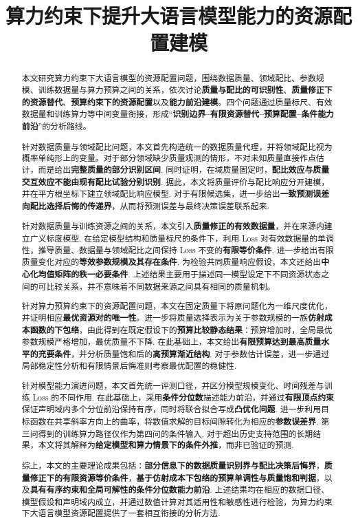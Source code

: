 \documentclass[bwprint]{gmcmthesis}
\title{算力约束下提升大语言模型能力的资源配置建模}
\theoremstyle{definition}
\theoremstyle{plain}
\theoremstyle{remark}
\begin{document}
\maketitle

\begin{abstract}
本文研究算力约束下大语言模型的资源配置问题，围绕数据质量、领域配比、参数规模、训练数据量与算力预算之间的关系，依次讨论\textbf{质量与配比的可识别性}、\textbf{质量修正下的资源替代}、\textbf{预算约束下的资源配置}以及\textbf{能力前沿建模}。四个问题通过质量标尺、有效数据量和训练算力等中间变量衔接，形成“\textbf{识别边界--有限资源替代--预算配置--条件能力前沿}”的分析路线。

针对数据质量与领域配比问题，本文首先构造统一的数据质量代理，并将领域配比视为概率单纯形上的变量。对于部分领域缺少质量观测的情形，不对未知质量直接作点估计，而是给出\textbf{完整质量的部分识别区间}. 同时证明，在域质量固定时，\textbf{配比效应与质量交互效应不能由现有配比试验分别识别}. 据此，本文将质量评价与配比响应分开建模，并在平方根坐标下建立领域配比响应模型. 对于有限候选集，进一步给出\textbf{一致预测误差向配比选择后悔的传递界}，从而将预测误差与最终决策误差联系起来.

针对数据质量与训练资源之间的关系，本文引入\textbf{质量修正的有效数据量}，并在来源内建立广义标度模型. 在给定模型结构和质量标尺的条件下，利用 Loss 对有效数据量的单调性，推导质量、数据量与领域配比之间保持 Loss 不变的\textbf{有限等价条件},  进一步给出有限质量变化对应的\textbf{等效参数规模及其存在条件}. 为检验共同质量响应假设，本文还给出\textbf{中心化均值矩阵的秩一必要条件}. 上述结果主要用于描述同一模型设定下不同资源状态之间的可比较关系，并不意味着不同数据来源之间具有相同的质量机制。

针对算力预算约束下的资源配置问题，本文在固定质量下将原问题化为一维尺度优化，并证明相应\textbf{最优资源对的唯一性}。进一步将质量选择表示为关于参数规模的一族\textbf{仿射成本函数的下包络}，由此得到在既定假设下的\textbf{预算比较静态结果}：预算增加时，全局最优参数规模严格增加，最优质量不下降. 在此基础上，本文给出\textbf{有限预算达到最高质量水平的充要条件}，并分析质量饱和后的\textbf{高预算渐近结构}. 对于参数估计误差，进一步通过局部稳定性分析和有限情景后悔准则考察最优配置的稳健性.

针对模型能力演进问题，本文首先统一评测口径，并区分模型规模变化、时间残差与训练 Loss 的不同作用. 在此基础上，采用\textbf{条件分位数}描述能力前沿，并通过\textbf{有限顶点约束}保证声明域内多个分位前沿保持有序，同时将联合拟合写成\textbf{凸优化问题}. 进一步利用目标函数在共享斜率方向上的曲率，将数值求解的目标间隙转化为相应的\textbf{参数误差界}. 第三问得到的训练算力路径仅作为第四问的条件输入, 对于超出历史支持范围的长期结果，本文将其解释为\textbf{给定模型和算力情景下的条件外推}，而非已验证的预测.

综上，本文的主要理论成果包括：\textbf{部分信息下的数据质量识别界与配比决策后悔界}，\textbf{质量修正下的有限资源等价条件}，\textbf{基于仿射成本下包络的预算单调性与质量饱和判据}，以及\textbf{具有有序约束和全局可解性的条件分位数能力前沿}. 上述结果均在相应的数据口径、模型假设和声明域内成立，并通过数值计算对其适用性和敏感性进行检验，为算力约束下大语言模型资源配置提供了一套相互衔接的分析方法.

\end{abstract}
\end{document}

